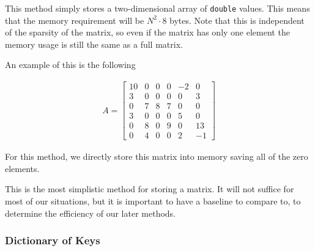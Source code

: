 \documentclass[../fem.tex]{subfiles}
\begin{document}
This method simply stores a two-dimensional array of \texttt{double}
values. This means that the memory requirement will be $N^2\cdot 8$ bytes. Note
that this is independent of the sparsity of the matrix, so even if the matrix
has only one element the memory usage is still the same as a full matrix.

An example of this is the following

\begin{align*}
  A = \begin{bmatrix}
    10 & 0 & 0 & 0 & -2 & 0 \\
    3 & 0 & 0 & 0 & 0 & 3 \\
    0 & 7 & 8 & 7 & 0 & 0 \\
    3 & 0 & 0 & 0 & 5 & 0 \\
    0 & 8 & 0 & 9 & 0 & 13 \\
    0 & 4 & 0 & 0 & 2 & -1
  \end{bmatrix}
\end{align*}

For this method, we directly store this matrix into memory saving all of the
zero elements.

This is the most simplistic method for storing a matrix. It will not suffice
for most of our situations, but it is important to have a baseline to compare
to, to determine the efficiency of our later methods.

\begin{Figure}
  \begin{center}
  \end{center}
  \label{fig:mat_full}
\end{Figure}

\subsubsection{Dictionary of Keys}%
\label{ssub:dictionary_of_keys}
\end{document}
